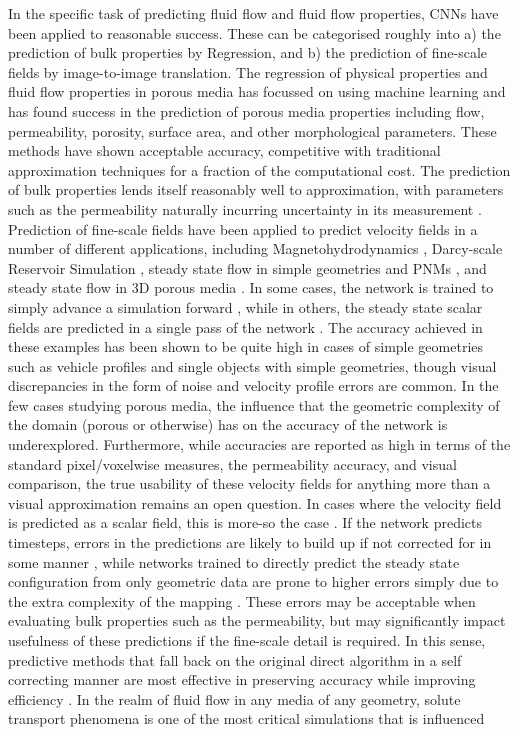 \documentclass{article}
\begin{document}
In the specific task of predicting fluid flow and fluid flow properties, CNNs have been applied to reasonable success. These can be categorised roughly into a) the prediction of bulk properties by Regression, and b) the prediction of fine-scale fields by image-to-image translation. The regression of physical properties and fluid flow properties in porous media has focussed on using machine learning and has found success in the prediction of porous media properties \cite{RN112,RN116,RN115,RN114,RN113,ebadi2013,ALQAHTANI2020106514,naifregression} including flow, permeability, porosity, surface area, and other morphological parameters. These methods have shown acceptable accuracy, competitive with traditional approximation techniques for a fraction of the computational cost. The prediction of bulk properties lends itself reasonably well to approximation, with parameters such as the permeability naturally incurring uncertainty in its measurement \cite{chappell2007comparison}. Prediction of fine-scale fields have been applied to predict velocity fields in a number of different applications, including Magnetohydrodynamics \cite{Van_Oort_2019}, Darcy-scale Reservoir Simulation \cite{wang2020efficient}, steady state flow in simple geometries \cite{autodeskflow} and PNMs \cite{rabbani2019hybrid}, and steady state flow in 3D porous media \cite{poreflownet}. In some cases, the network is trained to simply advance a simulation forward \cite{hennigh2017lat, wang2020efficient}, while in others, the steady state scalar fields are predicted in a single pass of the network \cite{poreflownet,autodeskflow,jin2018prediction}. The accuracy achieved in these examples has been shown to be quite high in cases of simple geometries such as vehicle profiles and single objects with simple geometries, though visual discrepancies in the form of noise and velocity profile errors are common. In the few cases studying porous media, the influence that the geometric complexity of the domain (porous or otherwise) has on the accuracy of the network is underexplored. Furthermore, while accuracies are reported as high in terms of the standard pixel/voxelwise measures, the permeability accuracy, and visual comparison, the true usability of these velocity fields for anything more than a visual approximation remains an open question. In cases where the velocity field is predicted as a scalar field, this is more-so the case \cite{poreflownet}. If the network predicts timesteps, errors in the predictions are likely to build up if not corrected for in some manner \cite{wang2020efficient}, while networks trained to directly predict the steady state configuration from only geometric data are prone to higher errors simply due to the extra complexity of the mapping \cite{poreflownet}. These errors may be acceptable when evaluating bulk properties such as the permeability, but may significantly impact usefulness of these predictions if the fine-scale detail is required. In this sense, predictive methods that fall back on the original direct algorithm in a self correcting manner are most effective in preserving accuracy while improving efficiency \cite{hennigh2017lat,wang2019multi}. In the realm of fluid flow in any media of any geometry, solute transport phenomena is one of the most critical simulations that is influenced 
\end{document}

